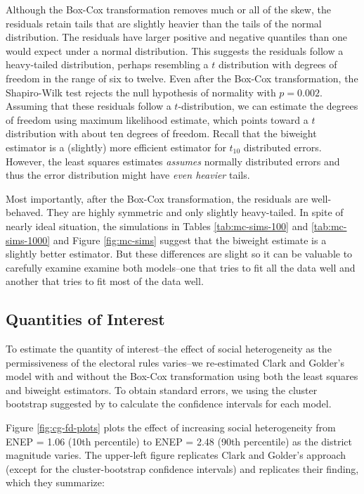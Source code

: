 \documentclass[12pt]{article}
\begin{document}
Although the Box-Cox transformation removes much or all of the skew, the residuals retain tails that are slightly heavier than the tails of the normal distribution. 
The residuals have larger positive and negative quantiles than one would expect under a normal distribution. 
This suggests the residuals follow a heavy-tailed distribution, perhaps resembling a $t$ distribution with degrees of freedom in the range of six to twelve. 
Even after the Box-Cox transformation, the Shapiro-Wilk test rejects the null hypothesis of normality with $p = 0.002$. 
Assuming that these residuals follow a $t$-distribution, we can estimate the degrees of freedom using maximum likelihood estimate, which points toward a $t$ distribution with about ten degrees of freedom. 
Recall that the biweight estimator is a (slightly) more efficient estimator for $t_{10}$ distributed errors. 
However, the least squares estimates \textit{assumes} normally distributed errors and thus the error distribution might have \textit{even heavier} tails.

Most importantly, after the Box-Cox transformation, the residuals are well-behaved. 
They are highly symmetric and only slightly heavy-tailed. 
In spite of nearly ideal situation, the simulations in Tables \ref{tab:mc-sims-100} and \ref{tab:mc-sims-1000} and Figure \ref{fig:mc-sims} suggest that the biweight estimate is a slightly better estimator. 
But these differences are slight so it can be valuable to carefully examine examine both models--one that tries to fit all the data well and another that tries to fit most of the data well.

\subsection*{Quantities of Interest}

To estimate the quantity of interest--the effect of social heterogeneity as the permissiveness of the electoral rules varies--we re-estimated Clark and Golder's model with and without the Box-Cox transformation using both the least squares and biweight estimators. 
To obtain standard errors, we using the cluster bootstrap suggested by \cite{Harden2012} to calculate the confidence intervals for each model.

Figure \ref{fig:cg-fd-plots} plots the effect of increasing social heterogeneity from ENEP = 1.06 (10th percentile) to ENEP = 2.48 (90th percentile) as the district magnitude varies. 
The upper-left figure replicates Clark and Golder's approach (except for the cluster-bootstrap confidence intervals) and replicates their finding, which they summarize:
\end{document}
